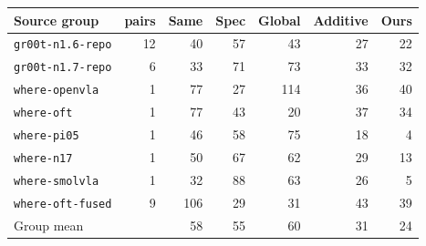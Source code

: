 \begin{tabular}{lrrrrrr}
\toprule
Source group & pairs & Same & Spec & Global & Additive & Ours \\
\midrule
\texttt{gr00t-n1.6-repo} & 12 & 40 & 57 & 43 & 27 & 22 \\
\texttt{gr00t-n1.7-repo} & 6 & 33 & 71 & 73 & 33 & 32 \\
\texttt{where-openvla} & 1 & 77 & 27 & 114 & 36 & 40 \\
\texttt{where-oft} & 1 & 77 & 43 & 20 & 37 & 34 \\
\texttt{where-pi05} & 1 & 46 & 58 & 75 & 18 & 4 \\
\texttt{where-n17} & 1 & 50 & 67 & 62 & 29 & 13 \\
\texttt{where-smolvla} & 1 & 32 & 88 & 63 & 26 & 5 \\
\texttt{where-oft-fused} & 9 & 106 & 29 & 31 & 43 & 39 \\
\midrule
Group mean & & 58 & 55 & 60 & 31 & 24 \\
\bottomrule
\end{tabular}
